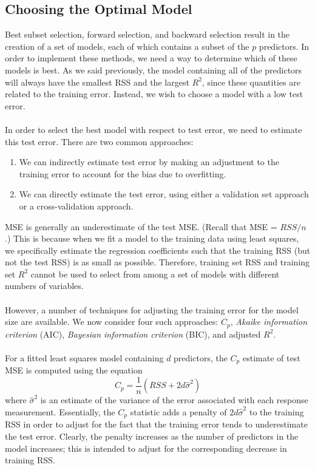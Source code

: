 \subsection{Choosing the Optimal Model}
Best subset selection, forward selection, and backward selection result in the creation of a set of models, each of which contains a subset of the $p$ predictors. In order to implement these methods, we need a way to determine
which of these models is best. As we said previously, the model
containing all of the predictors will always have the smallest RSS and the
largest $R^2$, since these quantities are related to the training error. Instead, we wish to choose a model with a low test error.\\\\
In order to select the best model with respect to test error, we need to estimate this test error. There are two common approaches:
\begin{enumerate}
    \item We can indirectly estimate test error by making an adjustment to the training error to account for the bias due to overfitting.

    \item We can directly estimate the test error, using either a validation set approach or a cross-validation approach.
\end{enumerate}
MSE is generally an underestimate of the test MSE. (Recall that MSE = $RSS/n$.) This is because
when we fit a model to the training data using least squares, we specifically estimate the regression coefficients such that the training RSS (but not the test RSS) is as small as possible. Therefore, training set RSS and training set $R^2$ cannot be used to select from among a set of models with different numbers of variables.\\\\
However, a number of techniques for adjusting the training error for the model size are available. We now consider four such approaches: $C_p$, \textit{Akaike information criterion} (AIC), \textit{Bayesian information criterion} (BIC), and adjusted $R^2$.\\\\
For a fitted least squares model containing $d$ predictors, the $C_p$ estimate
of test MSE is computed using the equation
\[C_p = \frac{1}{n} (RSS + 2d \hat{\sigma}^2)\]
where $\hat{\sigma}^2$ is an estimate of the variance of the error  associated with each response measurement. Essentially, the $C_p$ statistic adds a penalty of $2d \hat{\sigma}^2$ to the training RSS in order to adjust for the fact that the training error tends to underestimate the test error. Clearly, the penalty increases as the number of predictors in the model increases; this is intended to adjust for the corresponding decrease in training RSS.\\\\
